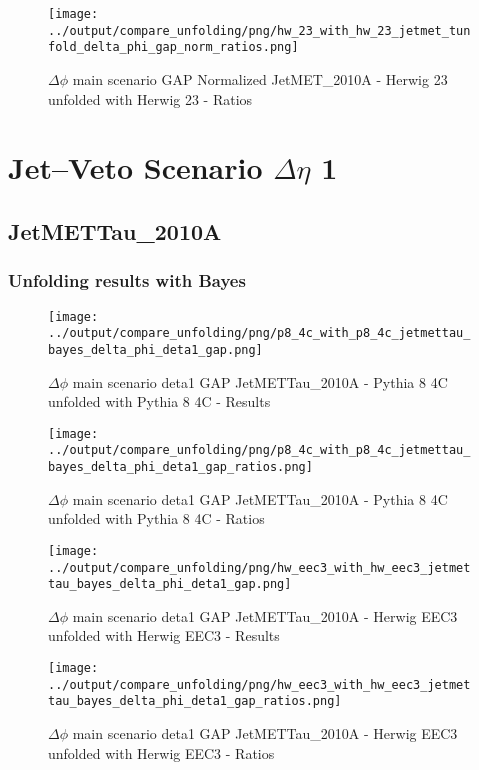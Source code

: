 \documentclass[11pt]{book}
\begin{document}
\begin{figure}[ht]
\centering
\texttt{[image: ../output/compare\_unfolding/png/hw\_23\_with\_hw\_23\_jetmet\_tunfold\_delta\_phi\_gap\_norm\_ratios.png]}
\caption{$\Delta\phi$ main scenario GAP Normalized JetMET\_2010A - Herwig 23 unfolded with Herwig 23 - Ratios}
\label{hw_23_hw_23_jetmet_tunfold_delta_phi_gap_norm_b}
\end{figure}



\cleardoublepage
\chapter{Jet--Veto Scenario $\Delta\eta$ 1}
\section{JetMETTau\_2010A}
\subsection{Unfolding results with Bayes}

\begin{figure}[ht]
\centering
\texttt{[image: ../output/compare\_unfolding/png/p8\_4c\_with\_p8\_4c\_jetmettau\_bayes\_delta\_phi\_deta1\_gap.png]}
\caption{$\Delta\phi$ main scenario deta1 GAP JetMETTau\_2010A - Pythia 8 4C unfolded with Pythia 8 4C - Results}
\label{p8_p8_jetmettau_bayes_delta_phi_deta1_gap_a}
\end{figure}

\begin{figure}[ht]
\centering
\texttt{[image: ../output/compare\_unfolding/png/p8\_4c\_with\_p8\_4c\_jetmettau\_bayes\_delta\_phi\_deta1\_gap\_ratios.png]}
\caption{$\Delta\phi$ main scenario deta1 GAP JetMETTau\_2010A - Pythia 8 4C unfolded with Pythia 8 4C - Ratios}
\label{p8_p8_jetmettau_bayes_delta_phi_deta1_gap_b}
\end{figure}

\begin{figure}[ht]
\centering
\texttt{[image: ../output/compare\_unfolding/png/hw\_eec3\_with\_hw\_eec3\_jetmettau\_bayes\_delta\_phi\_deta1\_gap.png]}
\caption{$\Delta\phi$ main scenario deta1 GAP JetMETTau\_2010A - Herwig EEC3 unfolded with Herwig EEC3 - Results}
\label{hw_eec3_hw_eec3_jetmettau_bayes_delta_phi_deta1_gap_a}
\end{figure}

\begin{figure}[ht]
\centering
\texttt{[image: ../output/compare\_unfolding/png/hw\_eec3\_with\_hw\_eec3\_jetmettau\_bayes\_delta\_phi\_deta1\_gap\_ratios.png]}
\caption{$\Delta\phi$ main scenario deta1 GAP JetMETTau\_2010A - Herwig EEC3 unfolded with Herwig EEC3 - Ratios}
\label{hw_eec3_hw_eec3_jetmettau_bayes_delta_phi_deta1_gap_b}
\end{figure}
\end{document}
